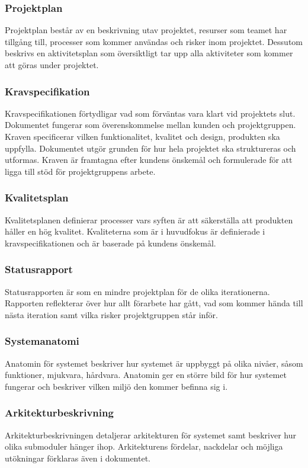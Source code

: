 \subsubsection*{Projektplan}
Projektplan består av en beskrivning utav projektet, resurser som teamet har tillgång till, processer som kommer användas och risker inom projektet. Dessutom beskrivs en aktivitetsplan som översiktligt tar upp alla aktiviteter som kommer att
göras under projektet.

\subsubsection*{Kravspecifikation}
Kravspecifikationen förtydligar vad som förväntas vara klart vid projektets slut. Dokumentet fungerar som överenskommelse mellan kunden och projektgruppen. Kraven specificerar vilken funktionalitet, kvalitet och design, produkten ska uppfylla. Dokumentet utgör grunden för hur hela projektet ska struktureras och utformas. Kraven är framtagna efter kundens önskemål och formulerade för att ligga till stöd för projektgruppens arbete.

\subsubsection*{Kvalitetsplan}
Kvalitetsplanen definierar processer vars syften är att säkerställa att produkten håller en hög kvalitet. Kvaliteterna som är i huvudfokus är definierade i kravspecifikationen och är baserade på kundens önskemål.

\subsubsection*{Statusrapport}
Statusrapporten är som en mindre projektplan för
de olika iterationerna. Rapporten reflekterar över hur allt förarbete har gått, vad som kommer
hända till nästa iteration samt vilka risker projektgruppen står inför.

\subsubsection*{Systemanatomi}
Anatomin för systemet beskriver hur systemet är uppbyggt på olika nivåer, såsom funktioner, mjukvara, hårdvara. Anatomin ger en större bild för hur systemet fungerar och beskriver vilken miljö den kommer befinna sig i.

\subsubsection*{Arkitekturbeskrivning}
Arkitekturbeskrivningen detaljerar arkitekturen för systemet samt beskriver hur olika submoduler hänger ihop. Arkitekturens fördelar, nackdelar och möjliga utökningar förklaras även i dokumentet.

